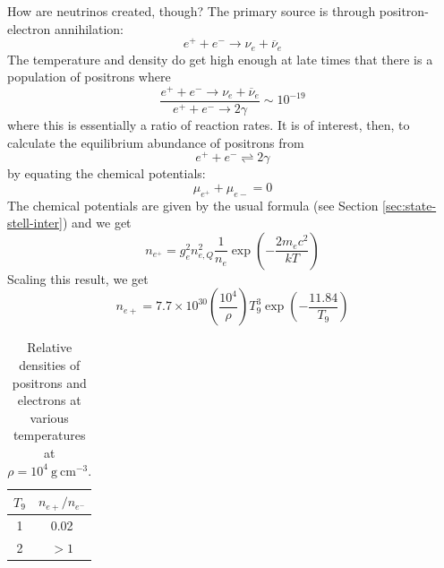\documentclass[10pt]{article}
\numberwithin{equation}{section}
\newcommand{\n}{\noindent}
\begin{document}
    \n How are neutrinos created, though? The primary source is through
    positron-electron annihilation:
    \begin{equation}
      \label{eq:342}
      e^++e^-\to\nu_e+\overline{\nu}_e
    \end{equation}
    The temperature and density do get high enough at late times that
    there is a population of positrons where
    \begin{equation}
      \label{eq:343}
      \frac{e^++e^-\to \nu_e+\overline{\nu}_e}{e^++e^-\to 2\gamma}\sim 10^
{-19}
    \end{equation}
    where this is essentially a ratio of reaction rates. It is of interest,
    then, to calculate the equilibrium abundance of positrons from
    \begin{equation}
      \label{eq:344}
      e^++e^-\rightleftharpoons 2\gamma
    \end{equation}
    by equating the chemical potentials:
    \begin{equation}
      \label{eq:345}
      \mu_{e^+}+\mu_{e-}=0
    \end{equation}
    The chemical potentials are given by the usual formula (see Section
    \ref{sec:state-stell-inter}) and we get
    \begin{equation}
      \label{eq:346}
      n_{e^+}=g_e^2n_{e,Q}^2\frac{1}{n_e}\exp\left(-\frac{2m_e c^2}{kT}
\right)
    \end{equation}
    Scaling this result, we get
    \begin{equation}
      \label{eq:347}
      n_{e+}=7.7\times 10^{30}\left(\frac{10^4}{\rho}\right)T_9^3\exp\left
(-\frac{11.84}{T_9}\right)
    \end{equation}
    \begin{table}[h]
      \centering
      \begin{tabular}{c c}
        $T_9$ & $n_{e+}/n_{e^-}$\\
        \hline \hline
        1 & 0.02\\
        2 & $>1$
      \end{tabular}
      \caption{Relative densities of positrons and electrons at various 
temperatures at $\rho=10^4\ \mathrm{g\ cm^{-3}}$.}
      \label{tab:positron}
    \end{table}
\end{document}
